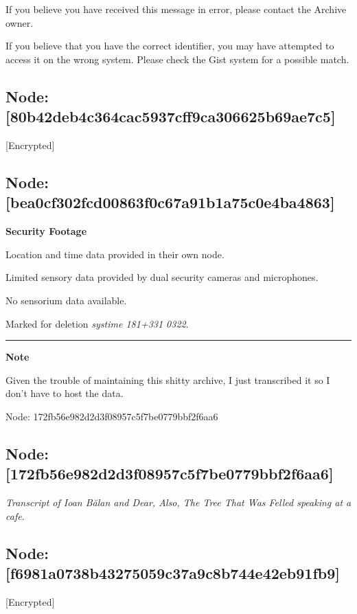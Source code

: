 If you believe you have received this message in error, please contact the Archive owner.

If you believe that you have the correct identifier, you may have attempted to access it on the wrong system. Please check the Gist system for a possible match.

\hypertarget{node-80b42deb4c364cac5937cff9ca306625b69ae7c5}{%
\subsection{Node: {[}80b42deb4c364cac5937cff9ca306625b69ae7c5{]}}\label{node-80b42deb4c364cac5937cff9ca306625b69ae7c5}}

{[}Encrypted{]}

\hypertarget{node-bea0cf302fcd00863f0c67a91b1a75c0e4ba4863}{%
\subsection{Node: {[}bea0cf302fcd00863f0c67a91b1a75c0e4ba4863{]}}\label{node-bea0cf302fcd00863f0c67a91b1a75c0e4ba4863}}

\textbf{Security Footage}

Location and time data provided in their own node.

Limited sensory data provided by dual security cameras and microphones.

No sensorium data available.

Marked for deletion \emph{systime 181+331 0322}.

\begin{center}\rule{0.5\linewidth}{0.5pt}\end{center}

\textbf{Note}

Given the trouble of maintaining this shitty archive, I just transcribed it so I don't have to host the data.

Node: 172fb56e982d2d3f08957c5f7be0779bbf2f6aa6

\hypertarget{node-172fb56e982d2d3f08957c5f7be0779bbf2f6aa6}{%
\subsection{Node: {[}172fb56e982d2d3f08957c5f7be0779bbf2f6aa6{]}}\label{node-172fb56e982d2d3f08957c5f7be0779bbf2f6aa6}}

\emph{Transcript of Ioan Bălan and Dear, Also, The Tree That Was Felled speaking at a cafe.}

\hypertarget{node-f6981a0738b43275059c37a9c8b744e42eb91fb9}{%
\subsection{Node: {[}f6981a0738b43275059c37a9c8b744e42eb91fb9{]}}\label{node-f6981a0738b43275059c37a9c8b744e42eb91fb9}}

{[}Encrypted{]}
